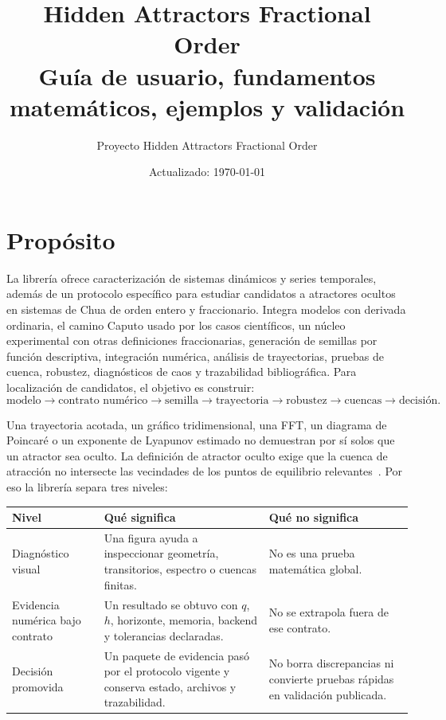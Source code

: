 \documentclass[11pt]{article}
\title{Hidden Attractors Fractional Order\\
\large Guía de usuario, fundamentos matemáticos, ejemplos y validación}
\author{Proyecto Hidden Attractors Fractional Order}
\date{Actualizado: \today}
\begin{document}
\maketitle
\setcounter{tocdepth}{2}
\tableofcontents

\section{Propósito}

La librería ofrece caracterización de sistemas dinámicos y series temporales,
además de un protocolo específico para estudiar candidatos a atractores
ocultos en sistemas de Chua de orden entero y fraccionario. Integra modelos con
derivada ordinaria, el camino Caputo usado por los casos científicos, un núcleo
experimental con otras definiciones fraccionarias, generación de semillas por función
descriptiva, integración numérica, análisis de trayectorias, pruebas de cuenca,
robustez, diagnósticos de caos y trazabilidad bibliográfica. Para localización
de candidatos, el objetivo es construir:
\[
\text{modelo}\to\text{contrato numérico}\to\text{semilla}\to
\text{trayectoria}\to\text{robustez}\to\text{cuencas}\to\text{decisión}.
\]

Una trayectoria acotada, un gráfico tridimensional, una FFT, un diagrama de Poincaré o un
exponente de Lyapunov estimado no demuestran por sí solos que un atractor sea
oculto. La definición de atractor oculto exige que la cuenca de atracción no
intersecte las vecindades de los puntos de equilibrio relevantes~\cite{LeonovKuznetsov2013,KuznetsovEtAl2017}. Por eso la librería separa
tres niveles:

\begin{center}
\small
\begin{tabular}{@{}L{0.23\textwidth}L{0.39\textwidth}L{0.29\textwidth}@{}}
\toprule
Nivel & Qué significa & Qué no significa \\
\midrule
Diagnóstico visual & Una figura ayuda a inspeccionar geometría, transitorios, espectro o cuencas finitas. & No es una prueba matemática global. \\
Evidencia numérica bajo contrato & Un resultado se obtuvo con \(q\), \(h\), horizonte, memoria, backend y tolerancias declaradas. & No se extrapola fuera de ese contrato. \\
Decisión promovida & Un paquete de evidencia pasó por el protocolo vigente y conserva estado, archivos y trazabilidad. & No borra discrepancias ni convierte pruebas rápidas en validación publicada. \\
\bottomrule
\end{tabular}
\end{center}
\end{document}

